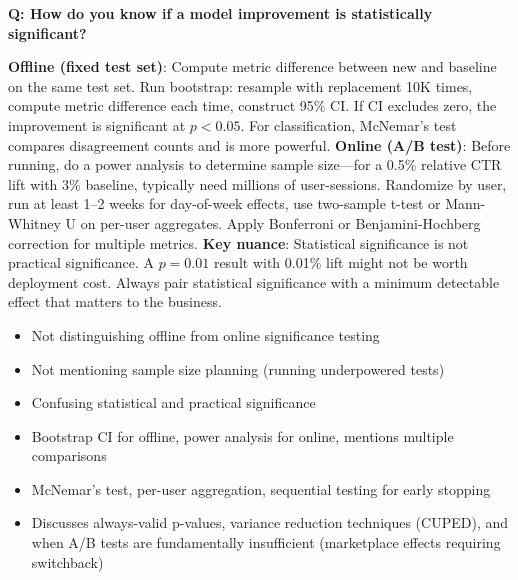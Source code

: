 \begin{interviewq}
\textbf{Q: How do you know if a model improvement is statistically significant?}

 \quad {} \quad \badgefreq{\freqhigh}

\stronganswer \textbf{Offline (fixed test set)}: Compute metric difference between new and baseline on the same test set. Run bootstrap: resample with replacement 10K times, compute metric difference each time, construct 95\% CI. If CI excludes zero, the improvement is significant at $p < 0.05$. For classification, McNemar's test compares disagreement counts and is more powerful. \textbf{Online (A/B test)}: Before running, do a power analysis to determine sample size---for a 0.5\% relative CTR lift with 3\% baseline, typically need millions of user-sessions. Randomize by user, run at least 1--2 weeks for day-of-week effects, use two-sample t-test or Mann-Whitney U on per-user aggregates. Apply Bonferroni or Benjamini-Hochberg correction for multiple metrics. \textbf{Key nuance}: Statistical significance is not practical significance. A $p = 0.01$ result with 0.01\% lift might not be worth deployment cost. Always pair statistical significance with a minimum detectable effect that matters to the business.

\redflags
\begin{itemize}
    \item Not distinguishing offline from online significance testing
    \item Not mentioning sample size planning (running underpowered tests)
    \item Confusing statistical and practical significance
\end{itemize}


\goodgreat
\begin{itemize}
    \item {} Bootstrap CI for offline, power analysis for online, mentions multiple comparisons
    \item {} McNemar's test, per-user aggregation, sequential testing for early stopping
    \item {} Discusses always-valid p-values, variance reduction techniques (CUPED), and when A/B tests are fundamentally insufficient (marketplace effects requiring switchback)
\end{itemize}

\end{interviewq}

